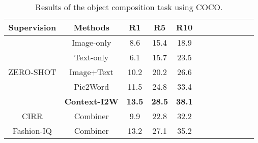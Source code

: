 \documentclass[letterpaper]{article} \usepackage{aaai24}  \usepackage{times}  \usepackage{helvet}  \usepackage{courier}  \usepackage[hyphens]{url}  \usepackage{graphicx} \urlstyle{rm} \def\UrlFont{\rm}  \usepackage{natbib}  \usepackage{caption} \frenchspacing  \setlength{\pdfpagewidth}{8.5in} \setlength{\pdfpageheight}{11in} \usepackage{algorithm}
\begin{document}
\begin{table}[t]
\centering
\scalebox{1.1}
{\scriptsize
\begin{tabular}{cccccccccccc}
\toprule
Supervision                                     & Methods                           & R1            & R5            & \multicolumn{1}{l}{R10} \\  \midrule
\multicolumn{1}{c|}{\multirow{5}{*}{ZERO-SHOT}} & \multicolumn{1}{c|}{Image-only}   & 8.6           & 15.4          & 18.9                    \\
\multicolumn{1}{c|}{}                           & \multicolumn{1}{c|}{Text-only}    & 6.1           & 15.7          & 23.5                    \\
\multicolumn{1}{c|}{}                           & \multicolumn{1}{c|}{Image+Text}   & 10.2          & 20.2          & 26.6                    \\
\multicolumn{1}{c|}{}                           & \multicolumn{1}{c|}{Pic2Word}     & 11.5          & 24.8          & 33.4                    \\
\multicolumn{1}{c|}{}                           & \multicolumn{1}{c|}{\textbf{Context-I2W}} & \textbf{13.5}          & \textbf{28.5}          & \textbf{38.1}           \\ \cmidrule(lr){1-5}
\multicolumn{1}{c|}{CIRR}                       & \multicolumn{1}{c|}{Combiner}     & 9.9           & 22.8          & 32.2                    \\
\multicolumn{1}{c|}{Fashion-IQ}                 & \multicolumn{1}{c|}{Combiner}     & 13.2          & 27.1          & 35.2                   \\ \bottomrule
\end{tabular}}
\caption{Results of the object composition task using COCO.}
\label{tab:coco}
\end{table}
\end{document}

